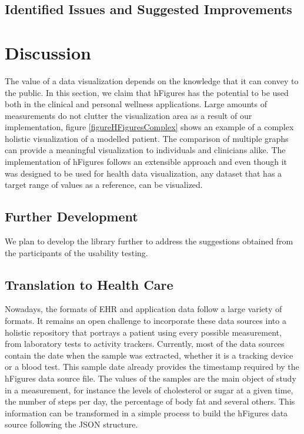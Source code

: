 \documentclass[twocolumn]{bmcart}%
\begin{document}
\subsection*{Identified Issues and Suggested Improvements}

\section*{Discussion}

The value of a data visualization depends on the knowledge that it can convey to the public. In this section, we claim that hFigures has the potential to be used both in the clinical and personal wellness applications. Large amounts of measurements do not clutter the visualization area as a result of our implementation, figure \ref{figureHFiguresComplex} shows an example of a complex holistic visualization of a modelled patient. The comparison of multiple graphs can provide a meaningful visualization to individuals and clinicians alike. The implementation of hFigures follows an extensible approach and even though it was designed to be used for health data visualization, any dataset that has a target range of values as a reference, can be visualized.

\subsection*{Further Development}

We plan to develop the library further to address the suggestions obtained from the participants of the usability testing.

\subsection*{Translation to Health Care}

Nowadays, the formats of EHR and application data follow a large variety of formats. It remains an open challenge to incorporate these data sources into a holistic repository that portrays a patient using every possible measurement, from laboratory tests to activity trackers. Currently, most of the data sources contain the date when the sample was extracted, whether it is a tracking device or a blood test. This sample date already provides the timestamp required by the hFigures data source file. The values of the samples are the main object of study in a measurement, for instance the levels of cholesterol or sugar at a given time, the number of steps per day, the percentage of body fat and several others. This information can be transformed in a simple process to build the hFigures data source following the JSON structure.
\end{document}
